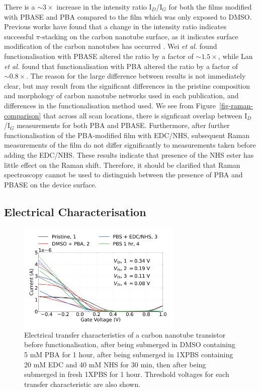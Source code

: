 \documentclass[
  a4paper,
]{scrbook}
\begin{document}
There is a \(\sim 3 \times\) increase in the intensity ratio
I\(_D\)/I\(_G\) for both the films modified with PBASE and PBA compared
to the film which was only exposed to DMSO. Previous works have found
that a change in the intensity ratio indicates successful
\(\pi\)-stacking on the carbon nanotube surface, as it indicates surface
modification of the carbon nanotubes has occurred
\autocite{Wei2010,Lan2013}. Wei \emph{et al.} found functionalisation
with PBASE altered the ratio by a factor of \(\sim 1.5 \times\), while
Lan \emph{et al.} found that functionalisation with PBA altered the
ratio by a factor of \(\sim 0.8 \times\). The reason for the large
difference between results is not immediately clear, but may result from
the significant differences in the pristine composition and morphology
of carbon nanotube networks used in each publication, and differences in
the functionalisation method used. We see from
Figure~\ref{fig-raman-comparison} that across all scan locations, there
is signficant overlap between I\(_D\)/I\(_G\) measurements for both PBA
and PBASE. Furthermore, after further functionalisation of the
PBA-modified film with EDC/NHS, subsequent Raman measurements of the
film do not differ significantly to measurements taken before adding the
EDC/NHS. These results indicate that presence of the NHS ester has
little effect on the Raman shift. Therefore, it should be clarified that
Raman spectroscopy cannot be used to distinguish between the presence of
PBA and PBASE on the device surface.

\hypertarget{electrical-characterisation-1}{%
\subsection{Electrical
Characterisation}\label{electrical-characterisation-1}}

\begin{figure}

{\centering \includegraphics[width=0.7\textwidth,height=\textheight]{figures/ch6/NTQ24C10_ch2_PBA.png}

}

\caption{\label{fig-pba-threshold-shift}Electrical transfer
characteristics of a carbon nanotube transistor before
functionalisation, after being submerged in DMSO containing 5 mM PBA for
1 hour, after being submerged in 1XPBS containing 20 mM EDC and 40 mM
NHS for 30 min, then after being submerged in fresh 1XPBS for 1 hour.
Threshold voltages for each transfer characteristic are also shown.}

\end{figure}
\end{document}
